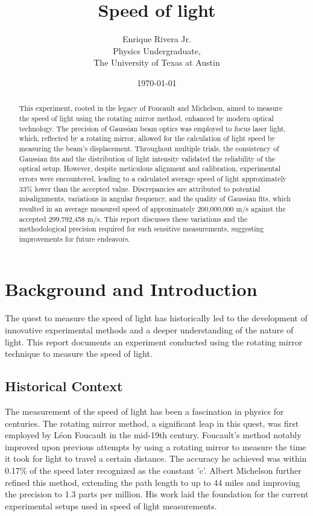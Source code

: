 \documentclass[12pt]{article}
\title{Speed of light}
\author{Enrique Rivera Jr. \\
                Physics Undergraduate, \\ 
                The University of Texas at Austin}
\date{\today}
\begin{document}
\maketitle

\begin{abstract}
        This experiment, rooted in the legacy of Foucault and Michelson, aimed to measure the speed of light 
        using the rotating mirror method, enhanced by modern optical technology. The precision of Gaussian beam optics 
        was employed to focus laser light, which, reflected by a rotating mirror, allowed for the calculation of light 
        speed by measuring the beam's displacement. Throughout multiple trials, the consistency of Gaussian fits and 
        the distribution of light intensity validated the reliability of the optical setup. However, despite meticulous 
        alignment and calibration, experimental errors were encountered, leading to a calculated average speed of 
        light approximately 33\% lower than the accepted value. Discrepancies are attributed to potential misalignments, 
        variations in angular frequency, and the quality of Gaussian fits, which resulted in an average measured speed 
        of approximately 200,000,000 m/s against the accepted 299,792,458 m/s. This report discusses these variations 
        and the methodological precision required for such sensitive measurements, suggesting improvements for future endeavors.        

\end{abstract}


\section{Background and Introduction}
        The quest to measure the speed of light has historically led to the development of innovative experimental methods and a deeper understanding of the nature of light. This report documents an experiment conducted using the rotating mirror technique to measure the speed of light. 

        \subsection{Historical Context}
        The measurement of the speed of light has been a fascination in physics for centuries. 
        The rotating mirror method, a significant leap in this quest, was first employed by Léon 
        Foucault in the mid-19th century. Foucault's method notably improved upon previous attempts 
        by using a rotating mirror to measure the time it took for light to travel a certain 
        distance. The accuracy he achieved was within 0.17\% of the speed later recognized as the 
        constant 'c'. Albert Michelson further refined this method, extending the path length 
        to up to 44 miles and improving the precision to 1.3 parts per million. His work laid 
        the foundation for the current experimental setups used in speed of light measurements.
\end{document}
